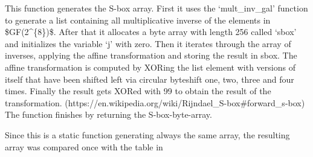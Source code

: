This function generates the S-box array. First it uses the
`mult\_inv\_gal' function to generate a list containing all
multiplicative inverse of the elements in \ac{$GF(2^{8})$}. After that it
allocates a byte array with length 256 called `sbox' and initializes the
variable `j' with zero. Then it iterates through the array of inverses,
applying the affine transformation and storing the result in sbox. The
affine transformation is computed by \ac{XOR}ing the list element with
versions of itself that have been shifted left via circular byteshift
one, two, three and four times. Finally the result gets \ac{XOR}ed with 99 to
obtain the result of the transformation.
(https://en.wikipedia.org/wiki/Rijndael\_S-box\#forward\_s-box) The
function finishes by returning the S-box-byte-array.

Since this is a static function generating always the same array, the
resulting array was compared once with the table in \cite[Fig. 7]{aes2001}
